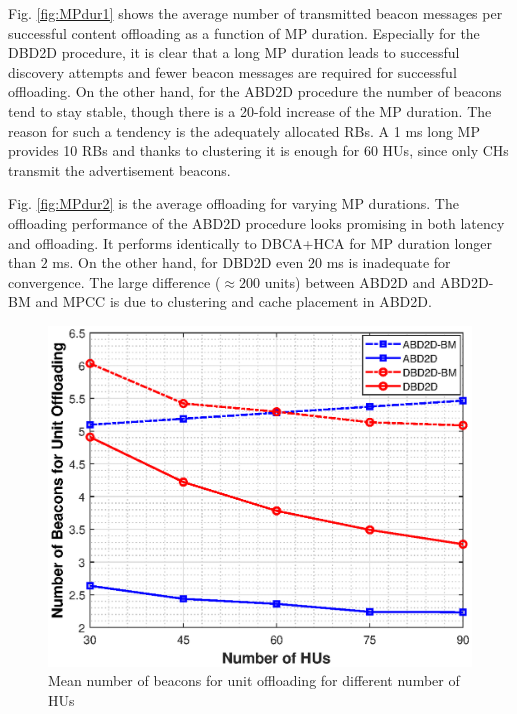 \documentclass[10pt,a4paper,twocolumn]{article}
\begin{document}
Fig. \ref{fig:MPdur1} shows the average number of transmitted beacon messages per successful content offloading as a function of MP duration. Especially for the DBD2D procedure, it is clear that a long MP duration leads to successful discovery attempts and fewer beacon messages are required for successful offloading. On the other hand, for the ABD2D procedure the number of beacons tend to stay stable, though there is a 20-fold increase of the MP duration. The reason for such a tendency is the adequately allocated RBs. A 1 ms long MP provides 10 RBs and thanks to clustering it is enough for 60 HUs, since only CHs transmit the advertisement beacons.



Fig. \ref{fig:MPdur2} is the average offloading for varying MP durations. The offloading performance of the ABD2D procedure looks promising in both latency and offloading. It performs identically to DBCA+HCA for MP duration longer than $2$ ms. On the other hand, for DBD2D even $20$ ms is inadequate for convergence. The large difference ($\approx 200$ units) between ABD2D and ABD2D-BM and MPCC is due to clustering and cache placement in ABD2D.

\begin{figure}[!htb]
	\centering
	
	\includegraphics[width=\columnwidth]{H1.eps}
	\caption{Mean number of beacons for unit offloading for different number of HUs}
	\label{fig:H1}
\end{figure}
\end{document}
